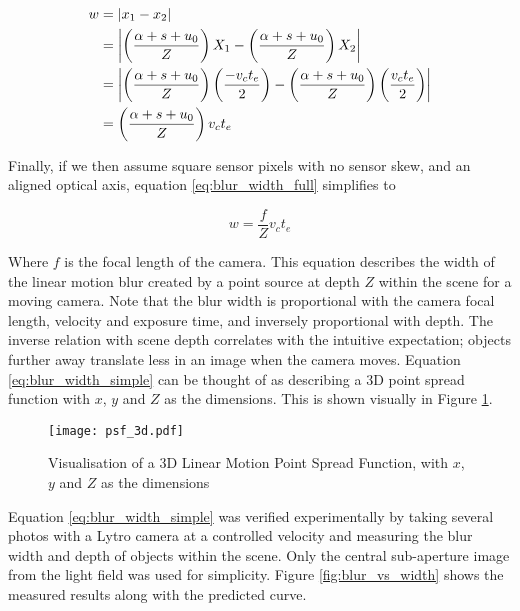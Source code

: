 \begin{align}
w &= \left| x_1 - x_2 \right| \notag \\
&= \left| \left( \frac{\alpha + s + u_0}{Z} \right) X_1 - \left( \frac{\alpha + s + u_0}{Z} \right) X_2 \right| \notag \\
&= \left| \left( \frac{\alpha + s + u_0}{Z} \right) \left(\frac{- v_c t_e}{2}\right) - \left( \frac{\alpha + s + u_0}{Z} \right) \left(\frac{v_c t_e}{2}\right) \right| \notag \\
\label{eq:blur_width_full}
&= \left( \frac{\alpha + s + u_0}{Z} \right) v_c t_e
\end{align}

Finally, if we then assume square sensor pixels with no sensor skew, and an aligned optical axis, equation \ref{eq:blur_width_full} simplifies to

\begin{equation}
\label{eq:blur_width_simple}
w = \frac{f}{Z} v_c t_e
\end{equation}

Where $f$ is the focal length of the camera.
This equation describes the width of the linear motion blur created by a point source at depth $Z$ within the scene for a moving camera.
Note that the blur width is proportional with the camera focal length, velocity and exposure time, and inversely proportional with depth.
The inverse relation with scene depth correlates with the intuitive expectation; objects further away translate less in an image when the camera moves.
Equation \ref{eq:blur_width_simple} can be thought of as describing a 3D point spread function with $x$, $y$ and $Z$ as the dimensions.
This is shown visually in Figure \ref{fig:psf_3d}.


\begin{figure}[h]

\centering

\texttt{[image: psf\_3d.pdf]}

\caption[Visualisation of a 3D Point Spread Function]{Visualisation of a 3D Linear Motion Point Spread Function, with $x$, $y$ and $Z$ as the dimensions}
\label{fig:psf_3d}

\end{figure}

Equation \ref{eq:blur_width_simple} was verified experimentally by taking several photos with a Lytro camera at a controlled velocity and measuring the blur width and depth of objects within the scene.
Only the central sub-aperture image from the light field was used for simplicity.
Figure \ref{fig:blur_vs_width} shows the measured results along with the predicted curve.

